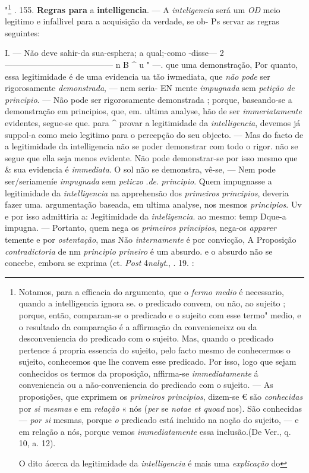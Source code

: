 "\footnote{Notamos, para a efficacia do argumento, que o \emph{fermo medio} é necessario, quando a intelligencia ignora se. o predicado convem, ou não, ao sujeito ; porque, então, comparam-se o predicado e o sujeito com esse termo" medio, e o resultado da comparação é a affirmação da convenieneixz ou da desconveniencia do predicado com o sujeito. Mas, quando o predicado pertence á propria essencia do sujeito, pelo facto mesmo de conhecermos o sujeito, conhecemos que lhe convem esse predicado. Por isso, logo que sejam conhecidos os termos da proposição, nffirma-se \emph{immediatamente} á conveniencia ou a não-conveniencia do predicado com o sujeito. --- As proposições, que exprimem os \emph{primeiros principios}, dizem-se € são \emph{conhecidas} por \emph{si mesmas} e em \emph{relação} « nós (\emph{per} se \emph{notae et quoad} nos). São conhecidas --- \emph{por si} mesmas, porque \emph{o} predicado está incluido na noção do sujeito, --- e em relação a nós, porque vemos \emph{immediatamente} essa inclusão.(De Ver., q. 10, a. 12).\par O dito ácerca da legitimidade da \emph{intelligencia} é mais uma \emph{explicação} do}   . 155. \textbf{Regras para} a \textbf{intelligencia}. --- A \emph{inteligencia} será um \emph{OD} meio legitimo e infallivel para a acquisição da verdade, se ob- Ps servar as regras seguintes:

I. --- Não deve sahir-da sua-esphera; a qual;-como -disse--- 2 --------------------------------------- n B \textasciicircum{} u " ---. que uma demonstração, Por quanto, essa legitimidade é de uma evidencia ua tão iwmediata, que \emph{não pode} ser rigorosamente \emph{demonstrada}, --- nem seria- EN mente \emph{impugnada} sem \emph{petição de principio}. --- Não pode ser rigorosamente demonstrada ; porque, baseando-se a demonstração em principios, que, em. ultima analyse, hão de ser \emph{immeriatamente} evidentes, segue-se que. para \textasciicircum{} provar a legitimidade da \emph{intelligencia}, devemos já suppol-a como meio legitimo para o percepção do seu objecto. --- Mas do facto de a legitimidade da intelligencia não se poder demonstrar com todo o rigor. não se segue que ella seja menos evidente. Não pode demonstrar-se por isso mesmo que \& sua evidencia é \emph{immediata}. O sol não se demonstra, vê-se, --- Nem pode ser/seriameníe \emph{impugnada} sem \emph{peticzo} .\emph{de}. \emph{principio}. Quem impugnasse a legitimidade da \emph{intelligencia} na apprehensão dos \emph{primeiros principios}, deveria fazer uma. argumentação baseada, em ultima analyse, nos mesmos \emph{principios}. Uv e por isso admittiria a: Jegitimidade da \emph{inteligencia}. ao mesmo: temp Dque-a impugna. --- Portanto, quem nega os \emph{primeiros principios}, nega-os \emph{apparer} temente e por \emph{ostentação}, mas Não \emph{internamente} é por convicção, A Proposição \emph{contradictoria} de nm \emph{principio prineiro} é um absurdo. e o absurdo não se concebe, embora se exprima (ct. \emph{Post} 4\emph{nalyt}., . 19. :


